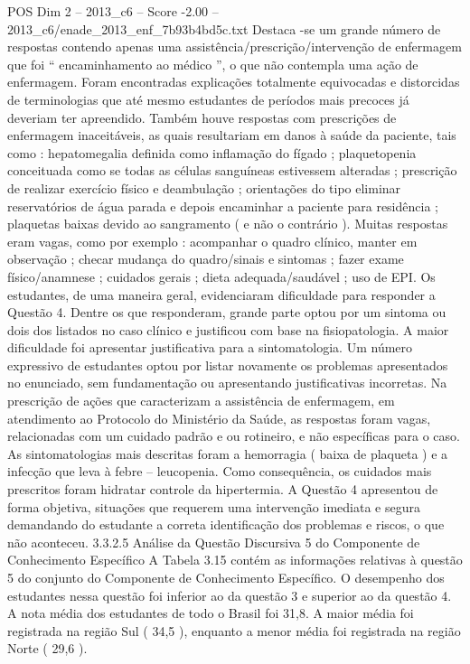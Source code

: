 \begin{textsample}{POS Dim 2 – 2013\_c6 – Score -2.00 – 2013\_c6/enade\_2013\_enf\_7b93b4bd5c.txt}
Destaca -se um grande número de respostas contendo apenas uma assistência/prescrição/intervenção de enfermagem que foi “ encaminhamento ao médico ”, o que não contempla uma ação de enfermagem.
Foram encontradas explicações totalmente equivocadas e distorcidas de terminologias que até mesmo estudantes de períodos mais precoces já deveriam ter apreendido.
Também houve respostas com prescrições de enfermagem inaceitáveis, as quais resultariam em danos à saúde da paciente, tais como : hepatomegalia definida como inflamação do fígado ; plaquetopenia conceituada como se todas as células sanguíneas estivessem alteradas ; prescrição de realizar exercício físico e deambulação ; orientações do tipo eliminar reservatórios de água parada e depois encaminhar a paciente para residência ; plaquetas baixas devido ao sangramento ( e não o contrário ).
Muitas respostas eram vagas, como por exemplo : acompanhar o quadro clínico, manter em observação ; checar mudança do quadro/sinais e sintomas ; fazer exame físico/anamnese ; cuidados gerais ; dieta adequada/saudável ; uso de EPI.
Os estudantes, de uma maneira geral, evidenciaram dificuldade para responder a Questão 4.
Dentre os que responderam, grande parte optou por um sintoma ou dois dos listados no caso clínico e justificou com base na fisiopatologia.
A maior dificuldade foi apresentar justificativa para a sintomatologia.
Um número expressivo de estudantes optou por listar novamente os problemas apresentados no enunciado, sem fundamentação ou apresentando justificativas incorretas.
Na prescrição de ações que caracterizam a assistência de enfermagem, em atendimento ao Protocolo do Ministério da Saúde, as respostas foram vagas, relacionadas com um cuidado padrão e ou rotineiro, e não específicas para o caso.
As sintomatologias mais descritas foram a hemorragia ( baixa de plaqueta ) e a infecção que leva à febre – leucopenia.
Como consequência, os cuidados mais prescritos foram hidratar controle da hipertermia.
A Questão 4 apresentou de forma objetiva, situações que requerem uma intervenção imediata e segura demandando do estudante a correta identificação dos problemas e riscos, o que não aconteceu. 3.3.2.5 Análise da Questão Discursiva 5 do Componente de Conhecimento Específico A Tabela 3.15 contém as informações relativas à questão 5 do conjunto do Componente de Conhecimento Específico.
O desempenho dos estudantes nessa questão foi inferior ao da questão 3 e superior ao da questão 4.
A nota média dos estudantes de todo o Brasil foi 31,8.
A maior média foi registrada na região Sul ( 34,5 ), enquanto a menor média foi registrada na região Norte ( 29,6 ).

\end{textsample}
